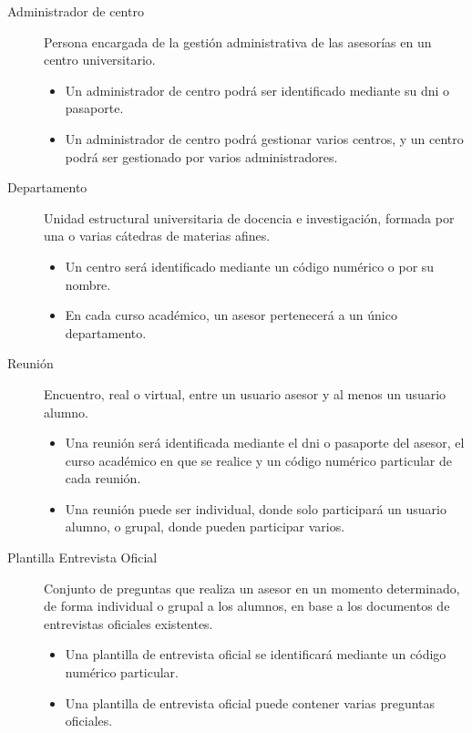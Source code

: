 \begin{description}
      \item[Administrador de centro] Persona encargada de la gestión
      administrativa de las asesorías en un centro universitario.
      \begin{itemize}
       \item Un administrador de centro podrá ser identificado mediante su dni o
       pasaporte.
       \item Un administrador de centro podrá gestionar varios centros, y un
       centro podrá ser gestionado por varios administradores.
      \end{itemize}

      \item[Departamento] Unidad estructural universitaria de docencia e
      investigación, formada por una o varias cátedras de materias afines.
      \begin{itemize}
       \item Un centro será identificado mediante un código numérico o por su
       nombre.
       \item En cada curso académico, un asesor pertenecerá a un único
       departamento.
      \end{itemize}

      \item[Reunión] Encuentro, real o virtual, entre un usuario asesor y al
      menos un usuario alumno.
      \begin{itemize}
       \item Una reunión será identificada mediante el dni o pasaporte del
       asesor, el curso académico en que se realice y un código numérico
       particular de cada reunión.
       \item Una reunión puede ser individual, donde solo participará un
       usuario alumno, o grupal, donde pueden participar varios.
      \end{itemize}

      \item[Plantilla Entrevista Oficial] Conjunto de preguntas que realiza un
      asesor en un momento determinado, de forma individual o grupal a los
      alumnos, en base a los documentos de entrevistas oficiales existentes.
      \begin{itemize}
       \item Una plantilla de entrevista oficial se identificará mediante un
       código numérico particular.
       \item Una plantilla de entrevista oficial puede contener varias preguntas
       oficiales.
      \end{itemize}


\end{description}
